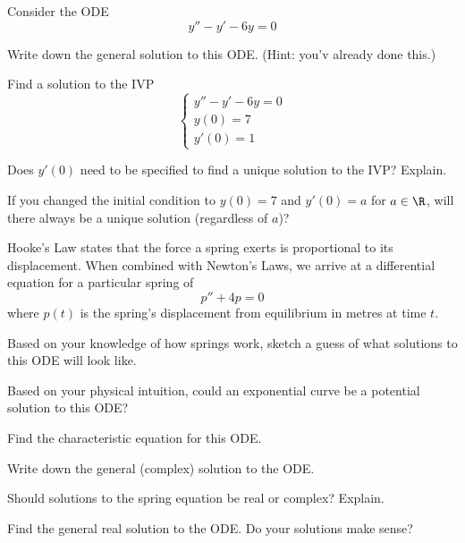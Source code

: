 \documentclass{workbook}
\begin{document}
\begin{slide}
	\question
	Consider the ODE
	\[
		y''-y'-6y=0
	\]

	\begin{parts}
		\item Write down the general solution to this ODE. (Hint: you'v already done this.)

		\item Find a solution to the IVP 
		\[
		\begin{cases}
			y''-y'-6y=0\\
			y(0)=7\\
			y'(0)=1
		\end{cases}
		\]

		\item Does $y'(0)$ need to be specified to find a unique solution to the IVP? Explain.

		\item If you changed the initial condition to $y(0)=7$ and $y'(0)=a$ for $a\in \R$, will there always be a unique solution (regardless of $a$)?
	\end{parts}
\end{slide}

\begin{slide}
	\question
	Hooke's Law states that the force a spring exerts is proportional
	to its displacement. When combined with Newton's Laws, we arrive at
	a differential equation for a particular spring of
	\[
		p''+4p=0
	\]
	where $p(t)$ is the spring's displacement from equilibrium in metres at time $t$.

	\begin{parts}
		\item Based on your knowledge of how springs work, sketch a guess of what solutions to this ODE will look like.
		\item Based on your physical intuition, could an exponential curve be a potential solution to this ODE?
		\item Find the characteristic equation for this ODE.
		\item Write down the general (complex) solution to the ODE.
		\item Should solutions to the spring equation be real or complex? Explain.
		\item Find the general real solution to the ODE. Do your solutions make sense?
	\end{parts}
\end{slide}
\end{document}
